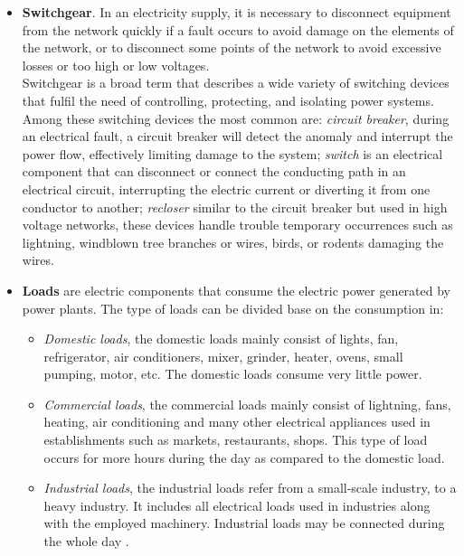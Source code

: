 \begin{itemize}
    \item \textbf{Switchgear}. In an electricity supply, it is necessary to disconnect equipment from the network quickly if a fault occurs to avoid damage on the elements of the network, or to disconnect some points of the network to avoid excessive losses or too high or low voltages. \\
    Switchgear is a broad term that describes a wide variety of switching devices that fulfil the need of controlling, protecting, and isolating power systems. Among these switching devices the most common are: \emph{circuit breaker}, during an electrical fault, a circuit breaker will detect the anomaly and interrupt the power flow, effectively limiting damage to the system; \emph{switch} is an electrical component that can disconnect or connect the conducting path in an electrical circuit, interrupting the electric current or diverting it from one conductor to another; \emph{recloser} similar to the circuit breaker but used in high voltage networks, these devices handle trouble temporary occurrences such as lightning, windblown tree branches or wires,
    birds, or rodents damaging the wires.
    
    \item \textbf{Loads} are electric components that consume the electric power generated by power plants. The type of loads can be divided base on the consumption in:
    \begin{itemize}
        \item[] \emph{Domestic loads}, the domestic loads mainly consist of lights, fan, refrigerator, air conditioners, mixer, grinder, heater, ovens, small pumping, motor, etc. The domestic loads consume very little power.
        \item[] \emph{Commercial loads}, the commercial loads mainly consist of lightning, fans, heating, air conditioning and many other electrical appliances used in establishments such as markets, restaurants, shops. This type of load occurs for more hours during the day as compared to the domestic load.
        \item[] \emph{Industrial loads}, the industrial loads refer from a small-scale industry, to a heavy industry. It includes all electrical loads used in industries along with the employed machinery. Industrial loads may be connected during the whole day \cite{EDNdesign}.
    \end{itemize}
    

\end{itemize}
